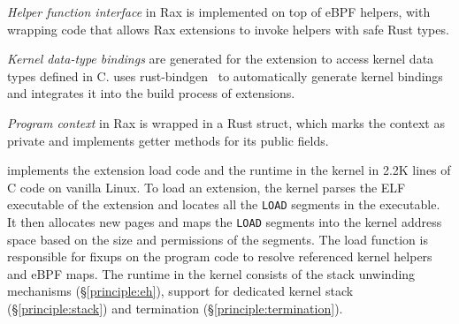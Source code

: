 \begin{packed_itemize}
\item {\it Helper function interface} in Rax is
    implemented on top of eBPF helpers, with
    wrapping code that allows Rax extensions to invoke helpers with safe Rust types.

\item {\it Kernel data-type bindings} are generated for the extension to access kernel
    data types defined in C.
\projname{} uses rust-bindgen~\cite{bindgen} to automatically generate
    kernel bindings and integrates it into the build process of extensions.

\item {\it Program context} in Rax is wrapped in a Rust struct, which marks
    the context as private and implements getter methods for its
    public fields.
\end{packed_itemize}

\vspace{-5pt}
\projname{} implements the extension load code and the runtime in the
    kernel in 2.2K lines of C code on vanilla Linux.
To load an extension, the kernel parses the ELF executable of the extension
    and locates all the \texttt{\small LOAD}
    segments in the executable.
It then allocates new pages and maps the \texttt{\small LOAD} segments into the kernel
    address space based on the size and permissions of the segments.
The load function is responsible for fixups on the program code to resolve
    referenced kernel helpers and eBPF maps.
The \projname{} runtime in the kernel consists of the stack
    unwinding mechanisms (\S\ref{principle:eh}), support for dedicated
    kernel stack (\S\ref{principle:stack}) and
    termination (\S\ref{principle:termination}).

